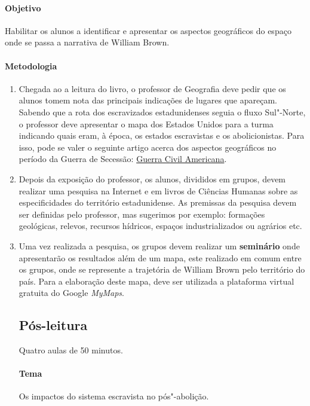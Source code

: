 \documentclass[11pt]{extarticle}
\begin{document}
 \paragraph{Objetivo} Habilitar os alunos a identificar e apresentar 
 os aspectos geográficos do espaço onde se passa a narrativa de William Brown.

 \paragraph{Metodologia}
   \begin{enumerate}
    \item
    Chegada ao a leitura do livro, o professor de Geografia deve 
    pedir que os alunos tomem nota das principais indicações de lugares
    que apareçam. Sabendo que a rota dos escravizados estadunidenses seguia
    o fluxo Sul"-Norte, o professor deve apresentar o mapa dos Estados Unidos
    para a turma indicando quais eram, à época, os estados escravistas
    e os abolicionistas. Para isso, pode se valer o seguinte artigo 
    acerca dos aspectos geográficos no período da Guerra de Secessão: 
    \href{https://brasilescola.uol.com.br/historiag/guerra-secessao.htm}{Guerra Civil Americana}.
    
    \item
    Depois da exposição do professor, os alunos, divididos em grupos,
    devem realizar uma pesquisa na Internet e em livros de Ciências Humanas
    sobre as especificidades do território
    estadunidense. As premissas da pesquisa devem ser definidas pelo
    professor, mas sugerimos por exemplo: formações geológicas,
    relevos, recursos hídricos, espaços industrializados ou agrários etc.

    \item
    Uma vez realizada a pesquisa, os grupos devem realizar um \textbf{seminário}
    onde apresentarão os resultados além de um mapa, este realizado em comum
    entre os grupos, onde se represente a trajetória de William Brown pelo
    território do país. Para a elaboração deste mapa, deve ser utilizada 
    a plataforma virtual gratuita do Google \emph{MyMaps}.

\subsection{Pós-leitura} Quatro aulas de 50 minutos.

 \paragraph{Tema} Os impactos do sistema escravista no pós"-abolição.


\end{enumerate}
\end{document}

